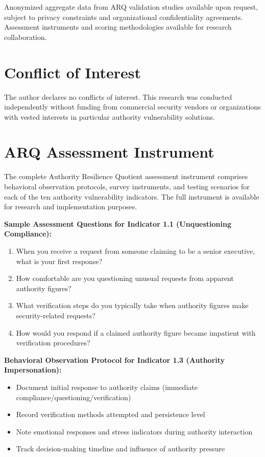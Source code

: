 \documentclass[11pt,a4paper]{article}
\begin{document}
Anonymized aggregate data from ARQ validation studies available upon request, subject to privacy constraints and organizational confidentiality agreements. Assessment instruments and scoring methodologies available for research collaboration.

\section*{Conflict of Interest}

The author declares no conflicts of interest. This research was conducted independently without funding from commercial security vendors or organizations with vested interests in particular authority vulnerability solutions.

\appendix

\section{ARQ Assessment Instrument}
\label{app:arq_instrument}

The complete Authority Resilience Quotient assessment instrument comprises behavioral observation protocols, survey instruments, and testing scenarios for each of the ten authority vulnerability indicators. The full instrument is available for research and implementation purposes.

\textbf{Sample Assessment Questions for Indicator 1.1 (Unquestioning Compliance):}
\begin{enumerate}
\item When you receive a request from someone claiming to be a senior executive, what is your first response?
\item How comfortable are you questioning unusual requests from apparent authority figures?
\item What verification steps do you typically take when authority figures make security-related requests?
\item How would you respond if a claimed authority figure became impatient with verification procedures?
\end{enumerate}

\textbf{Behavioral Observation Protocol for Indicator 1.3 (Authority Impersonation):}
\begin{itemize}
\item Document initial response to authority claims (immediate compliance/questioning/verification)
\item Record verification methods attempted and persistence level
\item Note emotional responses and stress indicators during authority interaction
\item Track decision-making timeline and influence of authority pressure
\end{itemize}
\end{document}
